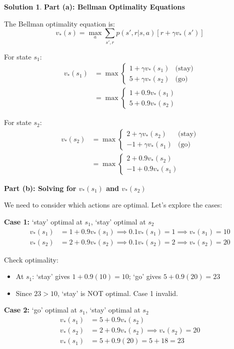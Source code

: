 \documentclass[11pt]{article}
\theoremstyle{definition}
\newtheorem*{solution}{Solution}
\begin{document}
\begin{solution}
\textbf{Part (a): Bellman Optimality Equations}

The Bellman optimality equation is:
\[
v_*(s) = \max_a \sum_{s',r} p(s',r|s,a)[r + \gamma v_*(s')]
\]

For state $s_1$:
\begin{align*}
v_*(s_1) &= \max \begin{cases}
1 + \gamma v_*(s_1) & \text{(stay)} \\
5 + \gamma v_*(s_2) & \text{(go)}
\end{cases} \\
&= \max \begin{cases}
1 + 0.9 v_*(s_1) \\
5 + 0.9 v_*(s_2)
\end{cases}
\end{align*}

For state $s_2$:
\begin{align*}
v_*(s_2) &= \max \begin{cases}
2 + \gamma v_*(s_2) & \text{(stay)} \\
-1 + \gamma v_*(s_1) & \text{(go)}
\end{cases} \\
&= \max \begin{cases}
2 + 0.9 v_*(s_2) \\
-1 + 0.9 v_*(s_1)
\end{cases}
\end{align*}

\textbf{Part (b): Solving for $v_*(s_1)$ and $v_*(s_2)$}

We need to consider which actions are optimal. Let's explore the cases:

\textbf{Case 1:} `stay' optimal at $s_1$, `stay' optimal at $s_2$
\begin{align*}
v_*(s_1) &= 1 + 0.9 v_*(s_1) \implies 0.1 v_*(s_1) = 1 \implies v_*(s_1) = 10 \\
v_*(s_2) &= 2 + 0.9 v_*(s_2) \implies 0.1 v_*(s_2) = 2 \implies v_*(s_2) = 20
\end{align*}

Check optimality:
\begin{itemize}
    \item At $s_1$: `stay' gives $1 + 0.9(10) = 10$; `go' gives $5 + 0.9(20) = 23$
    \item Since $23 > 10$, `stay' is NOT optimal. Case 1 invalid.
\end{itemize}

\textbf{Case 2:} `go' optimal at $s_1$, `stay' optimal at $s_2$
\begin{align*}
v_*(s_1) &= 5 + 0.9 v_*(s_2) \\
v_*(s_2) &= 2 + 0.9 v_*(s_2) \implies v_*(s_2) = 20 \\
v_*(s_1) &= 5 + 0.9(20) = 5 + 18 = 23
\end{align*}


\end{solution}
\end{document}
